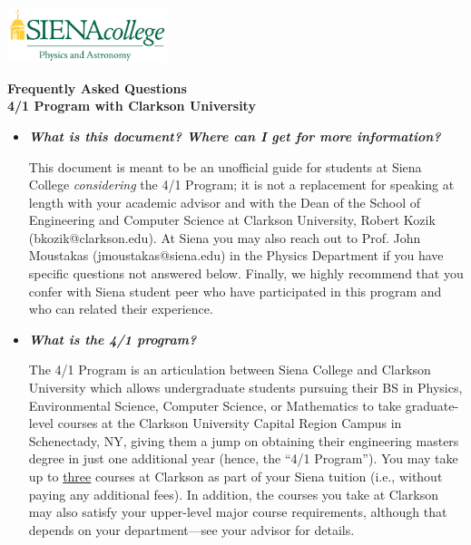 \documentclass[12pt]{article}
\begin{document}
\hfill \includegraphics[width=0.35\textwidth]{siena_phys_astro_print_crop.jpg}

\vspace{0.2cm}
\begin{center}
{\LARGE {\bf Frequently Asked Questions}} \\
\medskip
{\Large {\bf 4/1 Program with Clarkson University}} 
\end{center}
\vspace{0.3cm}


\begin{itemize}
\item{{\bf {\em What is this document? Where can I get for more information?}} 

This document is meant to be an unofficial guide for students at Siena College
\emph{considering} the 4/1 Program; it is not a replacement for speaking at
length with your academic advisor and with the Dean of the School of Engineering
and Computer Science at Clarkson University, Robert Kozik (bkozik@clarkson.edu).
At Siena you may also reach out to Prof. John Moustakas (jmoustakas@siena.edu)
in the Physics Department if you have specific questions not answered below.
Finally, we highly recommend that you confer with Siena student peer who have
participated in this program and who can related their experience.}

\item{{\bf {\em What is the 4/1 program?}}

The 4/1 Program is an articulation between Siena College and Clarkson University
which allows undergraduate students pursuing their BS in Physics, Environmental
Science, Computer Science, or Mathematics to take graduate-level courses at the
Clarkson University Capital Region Campus in Schenectady, NY, giving them a jump
on obtaining their engineering masters degree in just one additional year
(hence, the ``4/1 Program'').  You may take up to \underline{three} courses at
Clarkson as part of your Siena tuition (i.e., without paying any additional
fees).  In addition, the courses you take at Clarkson may also satisfy your
upper-level major course requirements, although that depends on your
department---see your advisor for details.}



\end{itemize}
\end{document}
